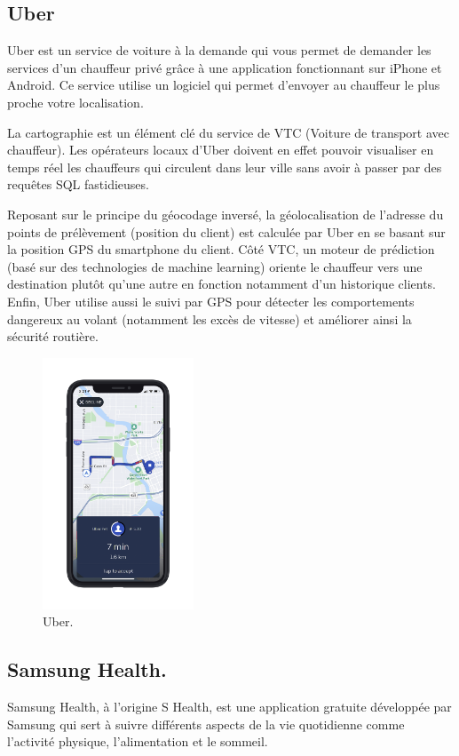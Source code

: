 \subsection{Uber}
Uber est un service de voiture à la demande qui vous permet de demander les services d'un chauffeur privé grâce à une application fonctionnant sur iPhone et Android. Ce service utilise un logiciel qui permet d'envoyer au chauffeur le plus proche votre localisation.

La cartographie est un élément clé du service de VTC (Voiture de transport avec chauffeur). Les opérateurs locaux d'Uber doivent en effet pouvoir visualiser en temps réel les chauffeurs qui circulent dans leur ville sans avoir à passer par des requêtes SQL fastidieuses.

Reposant sur le principe du géocodage inversé, la géolocalisation de l'adresse du points de prélèvement (position du client) est calculée par Uber en se basant sur la position GPS du smartphone du client. Côté VTC, un moteur de prédiction (basé sur des technologies de machine learning) oriente le chauffeur vers une destination plutôt qu'une autre en fonction notamment d'un historique clients. Enfin, Uber utilise aussi le suivi par GPS pour détecter les comportements dangereux au volant (notamment les excès de vitesse) et améliorer ainsi la sécurité routière.

\begin{figure}[h!]
    \center
    \includegraphics[width=0.4\textwidth]{Images/chapter1/uber.PNG}
    \caption{Uber.}
    \label{fig:Application}
\end{figure}

\subsection{Samsung Health.}
Samsung Health, à l'origine S Health, est une application gratuite développée par Samsung qui sert à suivre différents aspects de la vie quotidienne comme l'activité physique, l'alimentation et le sommeil.

